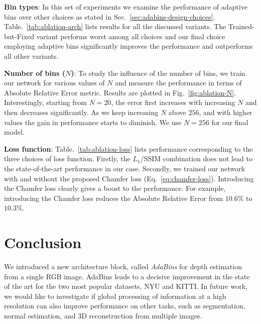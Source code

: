 \documentclass[final]{cvpr}
\begin{document}
\textbf{Bin types}:
In this set of experiments we examine the performance of adaptive bins over other choices as stated in Sec.~\ref{sec:adabins-design-choices}. Table.~\ref{tab:ablation-arch} lists results for all the discussed variants. The Trained-but-Fixed variant performs worst among all choices and our final choice employing adaptive bins significantly improves the performance and outperforms all other variants.\par

\textbf{Number of bins ($N$)}: To study the influence of the number of bins, we train our network for various values of $N$ and measure the performance in terms of Absolute Relative Error metric. Results are plotted in Fig.~\ref{fig:ablation-N}. Interestingly, starting from $N=20$, the error first increases with increasing $N$ and then decreases significantly. As we keep increasing $N$ above $256$, and with higher values the gain in performance starts to diminish. We use $N=256$ for our final model.\par

\textbf{Loss function}: Table.~\ref{tab:ablation-loss} lists performance corresponding to the three choices of loss function. Firstly, the $L_1$/SSIM combination does not lead to the state-of-the-art performance in our case. Secondly, we trained our network with and without the proposed Chamfer loss (Eq.~\ref{eq:chamfer-loss}). Introducing the Chamfer loss clearly gives a boost to the performance. For example, introducing the Chamfer loss reduces the Absolute Relative Error from $10.6\%$ to $10.3\%$.

\section{Conclusion}
We introduced a new architecture block, called \emph{AdaBins} for depth estimation from a single RGB image. AdaBins leads to a decisive improvement in the state of the art for the two most popular datasets, NYU and KITTI.
In future work, we would like to investigate if global processing of information at a high resolution can also improve performance on other tasks, such as segmentation, normal estimation, and 3D reconstruction from multiple images.



{\small


}
\end{document}
